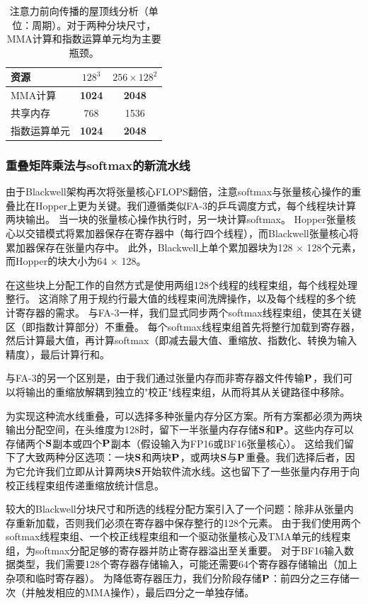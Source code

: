 \begin{table}[t]
\centering
\small
\begin{tabular}{lcc}
\toprule
资源 & $128^3$ & $256 \times 128^2$ \\
\midrule
MMA计算 & \textbf{1024} & \textbf{2048} \\
共享内存 & 768 & 1536 \\
指数运算单元 & \textbf{1024} & \textbf{2048} \\
\bottomrule
\end{tabular}
\caption{注意力前向传播的屋顶线分析（单位：周期）。对于两种分块尺寸，MMA计算和指数运算单元均为主要瓶颈。}
\label{tab:fwd_roofline}
\end{table}

\subsubsection{重叠矩阵乘法与softmax的新流水线}

由于Blackwell架构再次将张量核心FLOPS翻倍，注意softmax与张量核心操作的重叠比在Hopper上更为关键。我们遵循类似FA-3的乒乓调度方式，每个线程块计算两块输出。
当一块的张量核心操作执行时，另一块计算softmax。
Hopper张量核心以交错模式将累加器保存在寄存器中（每行四个线程），而Blackwell张量核心将累加器保存在张量内存中。
此外，Blackwell上单个累加器块为128 × 128个元素，而Hopper的块大小为64 × 128。

在这些块上分配工作的自然方式是使用两组128个线程的线程束组，每个线程处理整行。
这消除了用于规约行最大值的线程束间洗牌操作，以及每个线程的多个统计寄存器的需求。
与FA-3一样，我们显式同步两个softmax线程束组，使其在关键区（即指数计算部分）不重叠。
每个softmax线程束组首先将整行加载到寄存器，然后计算最大值，再计算softmax（即减去最大值、重缩放、指数化、转换为输入精度），最后计算行和。

与FA-3的另一个区别是，由于我们通过张量内存而非寄存器文件传输$\mathbf{P}$，我们可以将输出的重缩放解耦到独立的"校正"线程束组，从而将其从关键路径中移除。

为实现这种流水线重叠，可以选择多种张量内存分区方案。所有方案都必须为两块输出分配空间，在头维度为128时，留下一半张量内存存储$\mathbf{S}$和$\mathbf{P}$。这些内存可以存储两个$\mathbf{S}$副本或四个$\mathbf{P}$副本（假设输入为FP16或BF16张量核心）。
这给我们留下了大致两种分区选项：一块$\mathbf{S}$和两块$\mathbf{P}$，或两块$\mathbf{S}$与$\mathbf{P}$重叠。我们选择后者，因为它允许我们立即从计算两块$\mathbf{S}$开始软件流水线。这也留下了一些张量内存用于向校正线程束组传递重缩放统计信息。

较大的Blackwell分块尺寸和所选的线程分配方案引入了一个问题：除非从张量内存重新加载，否则我们必须在寄存器中保存整行的128个元素。
由于我们使用两个softmax线程束组、一个校正线程束组和一个驱动张量核心及TMA单元的线程束组，为softmax分配足够的寄存器并防止寄存器溢出至关重要。
对于BF16输入数据类型，我们需要128个寄存器存储输入，可能还需要64个寄存器存储输出（加上杂项和临时寄存器）。
为降低寄存器压力，我们分阶段存储$\mathbf{P}$：前四分之三存储一次（并触发相应的MMA操作），最后四分之一单独存储。

